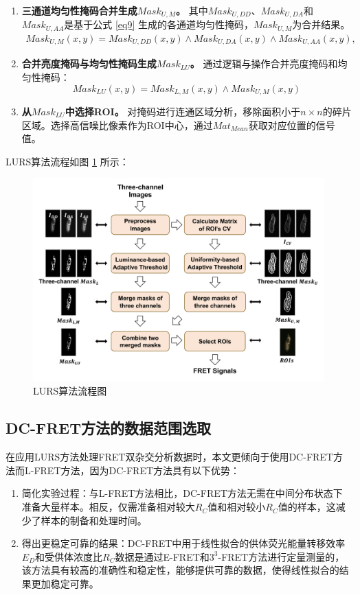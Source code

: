 \begin{enumerate}
\item \textbf{三通道均匀性掩码合并生成${Mask}_{U,M}$。}  
其中${Mask}_{U,DD}$、${Mask}_{U,DA}$和${Mask}_{U,AA}$是基于公式 \ref{eq9} 生成的各通道均匀性掩码，${Mask}_{U,M}$为合并结果。
\begin{equation}
    \begin{split}
    {Mask}_{U,M}(x,y)={Mask}_{U,DD}(x,y) \land {Mask}_{U,DA}(x,y) \land {Mask}_{U,AA}(x,y),
    \end{split}
    \label{eq_merge_u}
\end{equation}
\item \textbf{合并亮度掩码与均匀性掩码生成${Mask}_{LU}$。}  
通过逻辑与操作合并亮度掩码和均匀性掩码：
\begin{equation}
    {Mask}_{LU}(x,y)={Mask}_{L,M}(x,y) \land {Mask}_{U,M}(x,y)
    \label{eq10}
\end{equation}
\item \textbf{从${Mask}_{LU}$中选择ROI。}  
对掩码进行连通区域分析，移除面积小于$n \times n$的碎片区域。选择高信噪比像素作为ROI中心，通过${Mat}_{Mean}$获取对应位置的信号值。
\end{enumerate}

LURS算法流程如图 \ref{fig1} 所示：
\begin{figure}[!htbp]
\centering
\includegraphics[width=1\linewidth]{../figures/3/3_LURS流程图.png}
\caption{LURS算法流程图}\label{fig1}
\end{figure}

\subsection{DC-FRET方法的数据范围选取}
\ifshowtext
在应用LURS方法处理FRET双杂交分析数据时，本文更倾向于使用DC-FRET方法而L-FRET方法，因为DC-FRET方法具有以下优势：
\begin{enumerate}
    \item 简化实验过程：与L-FRET方法相比，DC-FRET方法无需在中间分布状态下准备大量样本。相反，仅需准备相对较大$R_C$值和相对较小$R_C$值的样本，这减少了样本的制备和处理时间。
    \item 得出更稳定可靠的结果：DC-FRET中用于线性拟合的供体荧光能量转移效率$E_D$和受供体浓度比$R_C$数据是通过E-FRET和$3^3$-FRET方法进行定量测量的，该方法具有较高的准确性和稳定性，能够提供可靠的数据，使得线性拟合的结果更加稳定可靠。
\end{enumerate}

